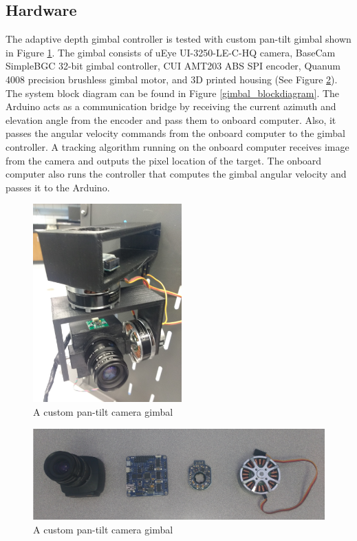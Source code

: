 \subsection{Hardware}
The adaptive depth gimbal controller is tested with custom pan-tilt gimbal shown in Figure \ref{gimbal}. The gimbal consists of uEye UI-3250-LE-C-HQ camera, BaseCam SimpleBGC 32-bit gimbal controller, CUI AMT203 ABS SPI encoder, Quanum 4008 precision brushless gimbal motor, and 3D printed housing (See Figure \ref{gimbal_parts}). The system block diagram can be found in Figure \ref{gimbal_blockdiagram}. The Arduino acts as a communication bridge by receiving the current azimuth and elevation angle from the encoder and pass them to onboard computer. Also, it passes the angular velocity commands from the onboard computer to the gimbal controller. A tracking algorithm running on the onboard computer receives image from the camera and outputs the pixel location of the target. The onboard computer also runs the controller that computes the gimbal angular velocity and passes it to the Arduino.
\begin{figure}[htbp]
	\centering
	\includegraphics[height = 3in]{images/chapter2/gimbal.jpg}
	\caption{A custom pan-tilt camera gimbal}
	\label{gimbal}
\end{figure}
\begin{figure}[htbp]
	\centering
	\includegraphics[width=0.8\linewidth]{images/chapter2/gimbal_parts.png}
	\caption{A custom pan-tilt camera gimbal}
	\label{gimbal_parts}
\end{figure}
